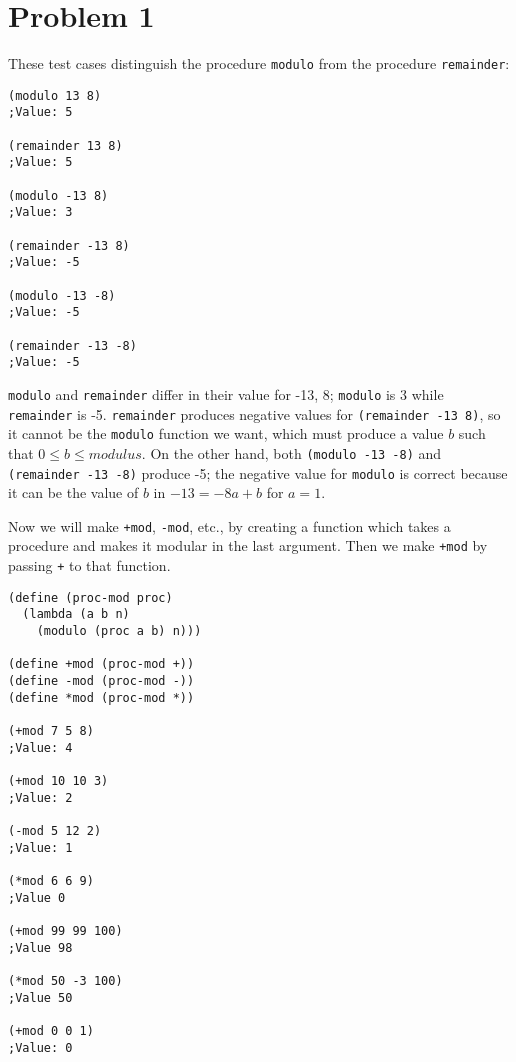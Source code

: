 \documentclass[12pt]{article}
\begin{document}
\maketitle

\section{Problem 1}

These test cases distinguish the procedure \texttt{modulo} from the
procedure \texttt{remainder}:

\begin{verbatim}
(modulo 13 8)
;Value: 5

(remainder 13 8)
;Value: 5

(modulo -13 8)
;Value: 3

(remainder -13 8)
;Value: -5

(modulo -13 -8)
;Value: -5

(remainder -13 -8)
;Value: -5
\end{verbatim}

\texttt{modulo} and \texttt{remainder} differ in their value for -13, 8; \texttt{modulo} is 3
while \texttt{remainder} is -5. \texttt{remainder} produces negative values for
\texttt{(remainder -13 8)}, so it cannot be the \texttt{modulo} function we want, which
must produce a value $b$ such that $0 \le b \le modulus$. On the other hand,
both \texttt{(modulo -13 -8)} and \texttt{(remainder -13 -8)} produce -5; the negative
value for \texttt{modulo} is correct because it can be the value of
$b$ in $ -13 =-8a + b$ for $a=1$.

Now we will make \texttt{+mod}, \texttt{-mod}, etc., by creating a function which
takes a procedure and makes it modular in the last argument. Then we
make \texttt{+mod} by passing \texttt{+} to that function.

\begin{verbatim}
(define (proc-mod proc)
  (lambda (a b n)
    (modulo (proc a b) n)))

(define +mod (proc-mod +))
(define -mod (proc-mod -))
(define *mod (proc-mod *))

(+mod 7 5 8)
;Value: 4

(+mod 10 10 3)
;Value: 2

(-mod 5 12 2)
;Value: 1

(*mod 6 6 9)
;Value 0

(+mod 99 99 100)
;Value 98

(*mod 50 -3 100)
;Value 50

(+mod 0 0 1)
;Value: 0

\end{verbatim}
\end{document}
